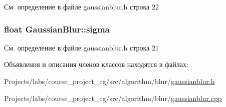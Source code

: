 См. определение в файле gaussianblur.\+h строка 22

\subsubsection[{\texorpdfstring{sigma}{sigma}}]{\setlength{\rightskip}{0pt plus 5cm}float Gaussian\+Blur\+::sigma\hspace{0.3cm}{\ttfamily [private]}}\hypertarget{class_gaussian_blur_ab43cc1fff30574e2e04876fda4a55441}{}\label{class_gaussian_blur_ab43cc1fff30574e2e04876fda4a55441}


См. определение в файле gaussianblur.\+h строка 21



Объявления и описания членов классов находятся в файлах\+:\begin{DoxyCompactItemize}
\item 
Projects/labs/course\+\_\+project\+\_\+cg/src/algorithm/blur/\hyperlink{gaussianblur_8h}{gaussianblur.\+h}\item 
Projects/labs/course\+\_\+project\+\_\+cg/src/algorithm/blur/\hyperlink{gaussianblur_8cpp}{gaussianblur.\+cpp}\end{DoxyCompactItemize}

